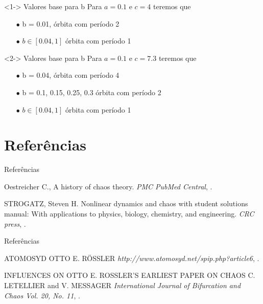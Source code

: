 \documentclass{beamer}
\begin{document}
\begin{frame}
	\begin{exampleblock}
		<1-> {Valores base para b}
			Para $a = 0.1$ e $c = 4$ teremos que 
			\begin{itemize}
				\item[$\bullet$] b = 0.01, órbita com período 2
				\item[$\bullet$] $b \in [0.04, 1]$ órbita com período 1
			\end{itemize}	
	\end{exampleblock}

	\begin{exampleblock}
		<2-> {Valores base para b}
			Para $a = 0.1$ e $c = 7.3$ teremos que 
			\begin{itemize}
				\item[$\bullet$] b = 0.04, órbita com período 4
				\item[$\bullet$] b = 0.1, 0.15, 0.25, 0.3 órbita com período 2
				\item[$\bullet$] $b \in [0.04, 1]$ órbita com período 1
			\end{itemize}	
	\end{exampleblock}
\end{frame}

\section{Referências}
\begin{frame}{Referências}
	\begin{thebibliography}{3}
		Oestreicher C.,
		\newblock A history of chaos theory.
		\newblock\emph{PMC PubMed Central},
		.
		
		\beamertemplatearticlebibitems
		STROGATZ, Steven H. 
		\newblock Nonlinear dynamics and chaos with student solutions manual: With applications to physics, biology, chemistry, and engineering.
		\newblock\emph{CRC press},
		.
     \end{thebibliography}
\end{frame}

\begin{frame}{Referências}
	\begin{thebibliography}{3}
		
		\beamertemplatearticlebibitems
		\bibitem{}
		ATOMOSYD
		\newblock OTTO E. RÖSSLER
		\newblock\emph{http://www.atomosyd.net/spip.php?article6},
		.
		
		\beamertemplatearticlebibitems
		INFLUENCES ON OTTO E. ROSSLER’S EARLIEST PAPER ON CHAOS
		\newblock C. LETELLIER and V. MESSAGER
		\newblock\emph{International Journal of Bifurcation and Chaos Vol. 20, No. 11},
		.
		
	\end{thebibliography}
\end{frame}
\end{document}
